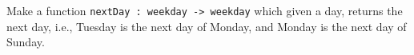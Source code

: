 Make a function \lstinline{nextDay : weekday -> weekday} which given a day, returns the next day, i.e., Tuesday is the next day of Monday, and Monday is the next day of Sunday.

